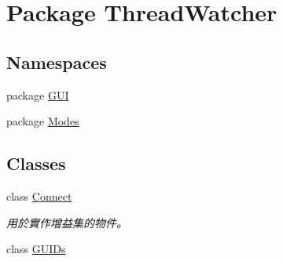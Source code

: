 \hypertarget{namespace_thread_watcher}{\section{Package Thread\+Watcher}
\label{namespace_thread_watcher}
}
\subsection*{Namespaces}
\begin{DoxyCompactItemize}
\item 
package \hyperlink{namespace_thread_watcher_1_1_g_u_i}{G\+U\+I}
\item 
package \hyperlink{namespace_thread_watcher_1_1_modes}{Modes}
\end{DoxyCompactItemize}
\subsection*{Classes}
\begin{DoxyCompactItemize}
\item 
class \hyperlink{class_thread_watcher_1_1_connect}{Connect}
\begin{DoxyCompactList}\small\item\em 用於實作增益集的物件。\end{DoxyCompactList}\item 
class \hyperlink{class_thread_watcher_1_1_g_u_i_ds}{G\+U\+I\+Ds}
\end{DoxyCompactItemize}
